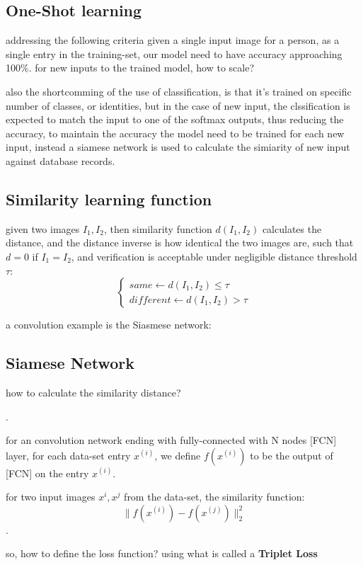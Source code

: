 \documentclass[4apaper,12pt]{book}
\begin{document}
  \subsection{One-Shot learning}
  \begin{description}
  \item addressing the following criteria given a single input image for a person, as a single entry in the training-set, our model need to have accuracy approaching 100\%. for new inputs to the trained model, how to scale?
    \item also the shortcomming of the use of classification, is that it's trained on specific number of classes, or identities, but in the case of new input, the clssification is expected to match the input to one of the softmax outputs, thus reducing the accuracy, to maintain the accuracy the model need to be trained for each new input, instead a siamese network is used to calculate the simiarity of new input against database records.
    \subsection{Similarity learning function}
    \begin{description}
    \item given two images $I_1,I_2$, then similarity function $d(I_1,I_2)$ calculates the distance, and the distance inverse is how identical the two images are, such that $d=0$ if $I_1=I_2$, and verification is acceptable under negligible distance threshold $\tau$: $$
      \begin{cases}
        same  \leftarrow d(I_1,I_2) \leq \tau \\
        different \leftarrow d(I_1,I_2) > \tau
      \end{cases}
      $$
      \item a convolution example is the Siasmese network:
    \end{description}
    \subsection{Siamese Network}
  \item how to calculate the similarity distance?
    \begin{description}
      \item .
    \item for an convolution network ending with fully-connected with N nodes [FCN] layer, for each data-set entry $x^{(i)}$, we define $f(x^{(i)})$ to be the output of [FCN] on the entry $x^{(i)}$.
    \item for two input images $x^i, x^j$ from the data-set, the similarity function: $$ \|f(x^{(i)}) - f(x^{(j)})\|_2^2 $$.
    \item so, how to define the loss function? using what is called a \textbf{Triplet Loss}

\end{description}
\end{description}
\end{document}
